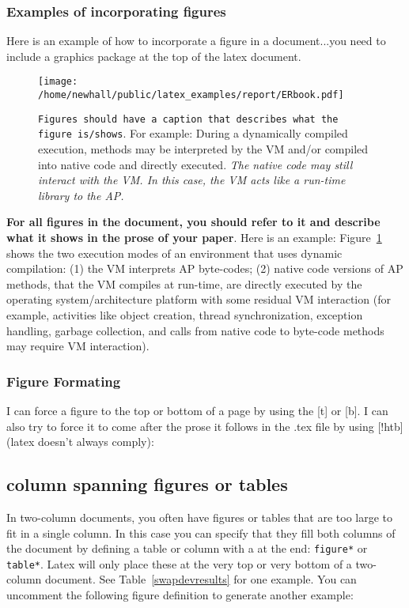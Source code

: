 \documentclass[11pt,twocolumn]{article}
\begin{document}
\subsubsection{Examples of incorporating figures}

Here is an example of how to incorporate a figure in a document...you need
to include a graphics package at the top of the latex document.  

\begin{figure}[t]
\centerline{\texttt{[image: /home/newhall/public/latex\_examples/report/ERbook.pdf]}}

\caption{ {\label{dyncompex} {\tt Figures should have a caption that 
    describes what the figure is/shows}.  For example: During a dynamically 
    compiled execution, methods may be interpreted by the VM and/or 
    compiled into native code and directly executed. 
    {\em The native code may still interact with the VM.  In this 
      case, the VM acts like a run-time library to the AP.
}}}
\end{figure}

{\bf For all figures in the document, you should refer to it and 
describe what it shows in the prose of your paper}.  Here is an example: 
Figure~\ref{dyncompex} shows the two execution modes of an 
environment that uses dynamic compilation: (1) the VM interprets AP 
byte-codes; (2) native code versions of AP methods, that the VM compiles 
at run-time, are directly executed by the operating system/architecture 
platform with some residual VM interaction (for example, activities like 
object creation, thread 
synchronization, exception handling, garbage collection, and calls from native 
code to byte-code methods may require VM interaction). 

\subsubsection {Figure Formating}

I can force a figure to the top or bottom of a page by using the [t] or [b].
I can also try to force it to come after the prose it follows in the .tex
file by using [!htb] (latex doesn't always comply):

\subsection {column spanning figures or tables}

In two-column documents, you often have figures or tables that are
too large to fit in a single column.  In this case you can specify
that they fill both columns of the document by defining a table or 
column with a {\tt *} at the end: {\tt figure*} or {\tt table*}. Latex
will only place these at the very top or very bottom of a two-column
document.   See Table~\ref{swapdevresults} for one example.  You can
uncomment the following figure definition to generate another example:
\end{document}
